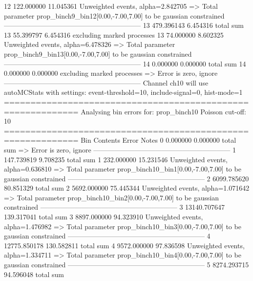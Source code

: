 12         122.000000      11.045361       Unweighted events, alpha=2.842705
  => Total parameter prop_binch9_bin12[0.00,-7.00,7.00] to be gaussian constrained
------------------------------------------------------------
13         479.396143      6.454316        total sum                     
13         55.399797       6.454316        excluding marked processes    
13         74.000000       8.602325        Unweighted events, alpha=6.478326
  => Total parameter prop_binch9_bin13[0.00,-7.00,7.00] to be gaussian constrained
------------------------------------------------------------
14         0.000000        0.000000        total sum                     
14         0.000000        0.000000        excluding marked processes    
  => Error is zero, ignore      
------------------------------------------------------------
Channel ch10 will use autoMCStats with settings: event-threshold=10, include-signal=0, hist-mode=1
============================================================
Analysing bin errors for: prop_binch10
Poisson cut-off: 10
============================================================
Bin        Contents        Error           Notes                         
0          0.000000        0.000000        total sum                     
  => Error is zero, ignore      
------------------------------------------------------------
1          147.739819      9.708235        total sum                     
1          232.000000      15.231546       Unweighted events, alpha=0.636810
  => Total parameter prop_binch10_bin1[0.00,-7.00,7.00] to be gaussian constrained
------------------------------------------------------------
2          6099.785620     80.851329       total sum                     
2          5692.000000     75.445344       Unweighted events, alpha=1.071642
  => Total parameter prop_binch10_bin2[0.00,-7.00,7.00] to be gaussian constrained
------------------------------------------------------------
3          13140.707647    139.317041      total sum                     
3          8897.000000     94.323910       Unweighted events, alpha=1.476982
  => Total parameter prop_binch10_bin3[0.00,-7.00,7.00] to be gaussian constrained
------------------------------------------------------------
4          12775.850178    130.582811      total sum                     
4          9572.000000     97.836598       Unweighted events, alpha=1.334711
  => Total parameter prop_binch10_bin4[0.00,-7.00,7.00] to be gaussian constrained
------------------------------------------------------------
5          8274.293715     94.596048       total sum                     
